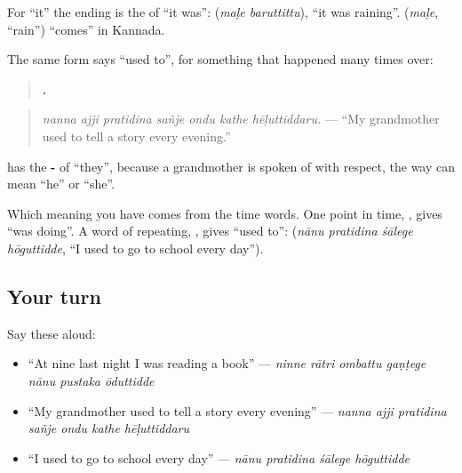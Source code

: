 For \textquotedblleft{}it\textquotedblright{} the ending is the \textbf{} of \textquotedblleft{}it was\textquotedblright{}: \textbf{ } (\emph{maḷe baruttittu}), \textquotedblleft{}it was raining\textquotedblright{}. \textbf{} (\emph{maḷe}, \textquotedblleft{}rain\textquotedblright{}) \textquotedblleft{}comes\textquotedblright{} in Kannada.

\begin{grammarlens}[title={Grammar Lens: the same form for a habit}]
The same form says \textquotedblleft{}used to\textquotedblright{}, for something that happened many times over:

\begin{quote}
\textbf{      .}
\end{quote}

\begin{quote}
\emph{nanna ajji pratidina sañje ondu kathe hēḷuttiddaru.} — \textquotedblleft{}My grandmother used to tell a story every evening.\textquotedblright{}
\end{quote}

\textbf{} has the \textbf{-} of \textquotedblleft{}they\textquotedblright{}, because a grandmother is spoken of with respect, the way \textbf{} can mean \textquotedblleft{}he\textquotedblright{} or \textquotedblleft{}she\textquotedblright{}.

Which meaning you have comes from the time words. One point in time, \textbf{  }, gives \textquotedblleft{}was doing\textquotedblright{}. A word of repeating, \textbf{}, gives \textquotedblleft{}used to\textquotedblright{}: \textbf{   } (\emph{nānu pratidina śālege hōguttidde}, \textquotedblleft{}I used to go to school every day\textquotedblright{}).
\end{grammarlens}

\subsection*{Your turn}
Say these aloud:

\begin{itemize}
\raggedright
  \item \textquotedblleft{}At nine last night I was reading a book\textquotedblright{} — \emph{ninne rātri ombattu gaṇṭege nānu pustaka ōduttidde}
  \item \textquotedblleft{}My grandmother used to tell a story every evening\textquotedblright{} — \emph{nanna ajji pratidina sañje ondu kathe hēḷuttiddaru}
  \item \textquotedblleft{}I used to go to school every day\textquotedblright{} — \emph{nānu pratidina śālege hōguttidde}
\end{itemize}

